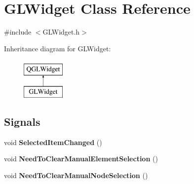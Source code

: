 \hypertarget{classGLWidget}{}\section{G\+L\+Widget Class Reference}
\label{classGLWidget}


{\ttfamily \#include $<$G\+L\+Widget.\+h$>$}

Inheritance diagram for G\+L\+Widget\+:\begin{figure}[H]
\begin{center}
\leavevmode
\includegraphics[height=2.000000cm]{classGLWidget}
\end{center}
\end{figure}
\subsection*{Signals}
\begin{DoxyCompactItemize}
\item 
\hypertarget{classGLWidget_a031d84e410b07e5c8afca4ab11e06c54}{}void {\bfseries Selected\+Item\+Changed} ()\label{classGLWidget_a031d84e410b07e5c8afca4ab11e06c54}

\item 
\hypertarget{classGLWidget_a628dd262f28dda97912e2f5d61eb8c6a}{}void {\bfseries Need\+To\+Clear\+Manual\+Element\+Selection} ()\label{classGLWidget_a628dd262f28dda97912e2f5d61eb8c6a}

\item 
\hypertarget{classGLWidget_a7bbc4801f4a079987dd5e7f46137b314}{}void {\bfseries Need\+To\+Clear\+Manual\+Node\+Selection} ()\label{classGLWidget_a7bbc4801f4a079987dd5e7f46137b314}

\end{DoxyCompactItemize}
